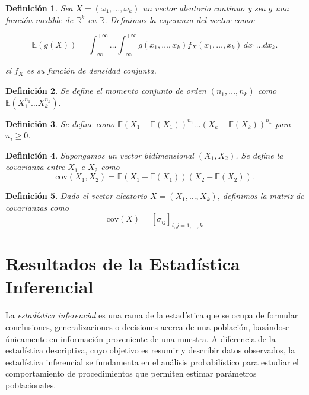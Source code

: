 \documentclass{report}
\newtheorem{dfn}{Definición}[section]
\begin{document}
\begin{dfn}\label{dfn:expected_value_vector_cont}
Sea $X = (\omega_1, \dots, \omega_k)$ un vector aleatorio continuo y sea $g$ una función medible de $\mathbb{R}^k$ en $\mathbb{R}$.
Definimos la esperanza del vector como:

\[
\mathbb{E}(g(X)) = \int_{-\infty}^{+\infty} \dots \int_{-\infty}^{+\infty} g(x_1,\dots,x_k)f_X(x_1,\dots,x_k) \,dx_1 \dots dx_k.
\]

si $f_X$ es su función de densidad conjunta.
\end{dfn}

\begin{dfn} \label{dfn:momento_conjunto}  Se define el momento conjunto de orden $(n_1,\dots,n_k)$ como $\mathbb{E}(X_1^{n_1} \dots X_k^{n_k})$.
\end{dfn}


\begin{dfn} \label{dfn:momento_conjunto_central}  Se define como $\mathbb{E}(X_1 - \mathbb{E}(X_1))^{n_1} \dots (X_k - \mathbb{E}(X_k))^{n_k}$ para $n_i \geq 0$.
\end{dfn}


\begin{dfn} \label{dfn:covarianza} Supongamos un vector bidimensional $(X_1,X_2)$. Se define la covarianza entre $X_1$ e $X_2$ como
\[
\mathrm{cov}(X_1, X_2) = \mathbb{E}(X_1 - \mathbb{E}(X_1))(X_2 - \mathbb{E}(X_2)).
\]
\end{dfn}

\begin{dfn} \label{dfn:matriz_covarianzas} Dado el vector aleatorio $X = (X_1,\dots,X_k)$, definimos la matriz de covarianzas como
\[
\mathrm{cov}(X) = [\sigma_{ij}]_{i,j=1,\dots,k}
\]
\end{dfn}

\section{Resultados de la Estadística Inferencial}


La \emph{estadística inferencial} es una rama de la estadística que se ocupa de formular conclusiones, generalizaciones o decisiones acerca de una población, basándose únicamente
en información proveniente de una muestra. A diferencia de la estadística descriptiva, cuyo objetivo es resumir y describir datos observados, la estadística inferencial se
fundamenta en el análisis probabilístico para estudiar el comportamiento de procedimientos que permiten estimar parámetros poblacionales.
\end{document}
